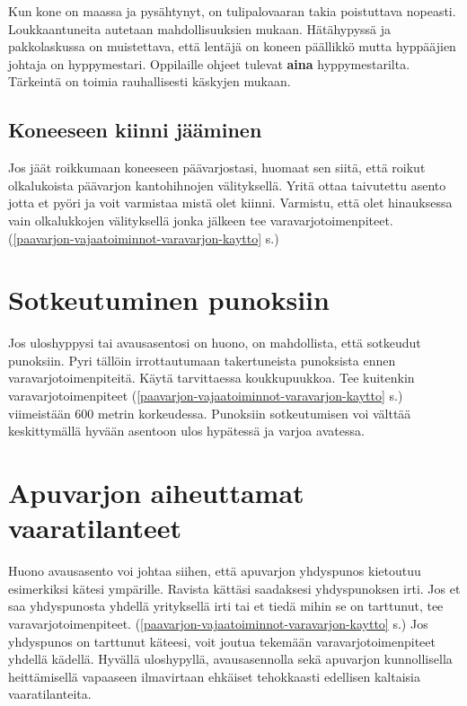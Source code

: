 Kun kone on maassa ja pysähtynyt, on tulipalovaaran takia poistuttava nopeasti. Loukkaantuneita autetaan mahdollisuuksien mukaan. Hätähypyssä ja pakkolaskussa on muistettava, että lentäjä on koneen päällikkö mutta hyppääjien johtaja on hyppymestari. Oppilaille ohjeet tulevat \textbf{aina} hyppymestarilta. Tärkeintä on toimia rauhallisesti käskyjen mukaan. 

\subsection{ Koneeseen kiinni jääminen }
\label{mahdolliset-vaaratilanteet-koneeseen-kiinni-jaaminen}


Jos jäät roikkumaan koneeseen päävarjostasi, huomaat sen siitä, että roikut olkalukoista päävarjon kantohihnojen välityksellä. Yritä ottaa taivutettu asento jotta et pyöri ja voit varmistaa mistä olet kiinni. Varmistu, että olet hinauksessa vain olkalukkojen välityksellä jonka jälkeen tee varavarjotoimenpiteet. (\ref{paavarjon-vajaatoiminnot-varavarjon-kaytto} s.\pageref{paavarjon-vajaatoiminnot-varavarjon-kaytto}) 

\section{ Sotkeutuminen punoksiin }
\label{mahdolliset-vaaratilanteet-sotkeutuminen-punoksiin}


Jos uloshyppysi tai avausasentosi on huono, on mahdollista, että sotkeudut punoksiin. Pyri tällöin irrottautumaan takertuneista punoksista ennen varavarjotoimenpiteitä. Käytä tarvittaessa koukkupuukkoa. Tee kuitenkin varavarjotoimenpiteet (\ref{paavarjon-vajaatoiminnot-varavarjon-kaytto} s.\pageref{paavarjon-vajaatoiminnot-varavarjon-kaytto}) viimeistään 600 metrin korkeudessa. Punoksiin sotkeutumisen voi välttää keskittymällä hyvään asentoon ulos hypätessä ja varjoa avatessa. 

\section{ Apuvarjon aiheuttamat vaaratilanteet }
\label{mahdolliset-vaaratilanteet-apuvarjon-aiheuttamat-vaaratilanteet}


Huono avausasento voi johtaa siihen, että apuvarjon yhdyspunos kietoutuu esimerkiksi kätesi ympärille. Ravista kättäsi saadaksesi yhdyspunoksen irti. Jos et saa yhdyspunosta yhdellä yrityksellä irti tai et tiedä mihin se on tarttunut, tee varavarjotoimenpiteet. (\ref{paavarjon-vajaatoiminnot-varavarjon-kaytto} s.\pageref{paavarjon-vajaatoiminnot-varavarjon-kaytto}) Jos yhdyspunos on tarttunut käteesi, voit joutua tekemään varavarjotoimenpiteet yhdellä kädellä. Hyvällä uloshypyllä, avausasennolla sekä apuvarjon kunnollisella heittämisellä vapaaseen ilmavirtaan ehkäiset tehokkaasti edellisen kaltaisia vaaratilanteita. 



